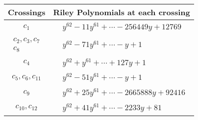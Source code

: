 \documentclass[1p]{elsarticle_modified}
\theoremstyle{definition}
\begin{document}
\begin{tabular}{m{50pt}|m{274pt}}
Crossings & \hspace{64pt}Riley Polynomials at each crossing \\
\hline $$\begin{aligned}c_{1}\end{aligned}$$&$\begin{aligned}
&y^{62}-11 y^{61}+\cdots-256449 y+12769
\end{aligned}$\\
\hline $$\begin{aligned}c_{2},c_{3},c_{7}\\c_{8}\end{aligned}$$&$\begin{aligned}
&y^{62}-71 y^{61}+\cdots- y+1
\end{aligned}$\\
\hline $$\begin{aligned}c_{4}\end{aligned}$$&$\begin{aligned}
&y^{62}+y^{61}+\cdots+127 y+1
\end{aligned}$\\
\hline $$\begin{aligned}c_{5},c_{6},c_{11}\end{aligned}$$&$\begin{aligned}
&y^{62}-51 y^{61}+\cdots- y+1
\end{aligned}$\\
\hline $$\begin{aligned}c_{9}\end{aligned}$$&$\begin{aligned}
&y^{62}+25 y^{61}+\cdots-2665888 y+92416
\end{aligned}$\\
\hline $$\begin{aligned}c_{10},c_{12}\end{aligned}$$&$\begin{aligned}
&y^{62}+41 y^{61}+\cdots-2233 y+81
\end{aligned}$\\
\hline
\end{tabular}
\vskip 2pc
\end{document}
